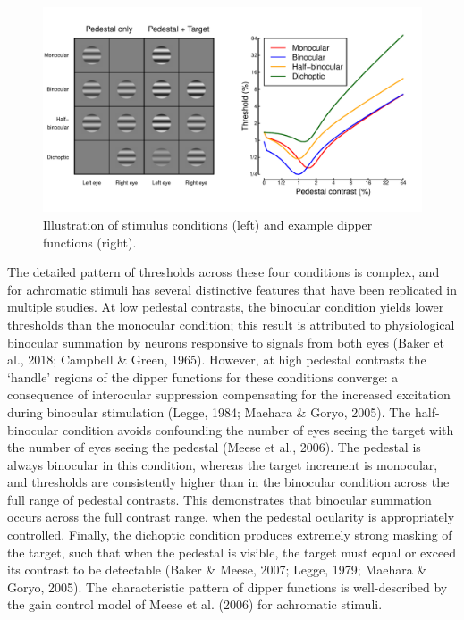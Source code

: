 \documentclass[
  letterpaper,
  DIV=11,
  numbers=noendperiod]{scrartcl}
\begin{document}
\begin{figure}

{\centering \includegraphics{Figures/exampledips.pdf}

}

\caption{\label{fig-exampledips}Illustration of stimulus conditions
(left) and example dipper functions (right).}

\end{figure}

The detailed pattern of thresholds across these four conditions is
complex, and for achromatic stimuli has several distinctive features
that have been replicated in multiple studies. At low pedestal
contrasts, the binocular condition yields lower thresholds than the
monocular condition; this result is attributed to physiological
binocular summation by neurons responsive to signals from both eyes
(Baker et al., 2018; Campbell \& Green, 1965). However, at high pedestal
contrasts the `handle' regions of the dipper functions for these
conditions converge: a consequence of interocular suppression
compensating for the increased excitation during binocular stimulation
(Legge, 1984; Maehara \& Goryo, 2005). The half-binocular condition
avoids confounding the number of eyes seeing the target with the number
of eyes seeing the pedestal (Meese et al., 2006). The pedestal is always
binocular in this condition, whereas the target increment is monocular,
and thresholds are consistently higher than in the binocular condition
across the full range of pedestal contrasts. This demonstrates that
binocular summation occurs across the full contrast range, when the
pedestal ocularity is appropriately controlled. Finally, the dichoptic
condition produces extremely strong masking of the target, such that
when the pedestal is visible, the target must equal or exceed its
contrast to be detectable (Baker \& Meese, 2007; Legge, 1979; Maehara \&
Goryo, 2005). The characteristic pattern of dipper functions is
well-described by the gain control model of Meese et al. (2006) for
achromatic stimuli.
\end{document}
